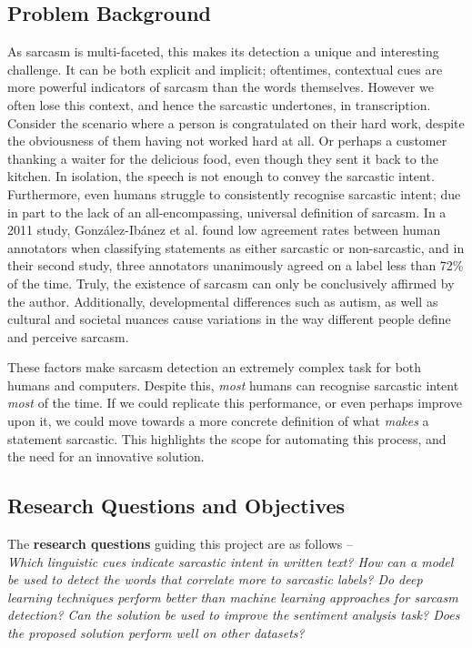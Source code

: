\documentclass[12pt,a4paper]{article}
\begin{document}
\subsection{Problem Background}
\noindent As sarcasm is multi-faceted, this makes its detection a unique and interesting challenge. It can be both explicit and implicit; oftentimes, contextual cues are more powerful indicators of sarcasm than the words themselves. However we often lose this context, and hence the sarcastic undertones, in transcription. Consider the scenario where a person is congratulated on their hard work, despite the obviousness of them having not worked hard at all. Or perhaps a customer thanking a waiter for the delicious food, even though they sent it back to the kitchen. In isolation, the speech is not enough to convey the sarcastic intent. Furthermore, even humans struggle to consistently recognise sarcastic intent; due in part to the lack of an all-encompassing, universal definition of sarcasm. In a 2011 study, Gonz{\'a}lez-Ib{\'a}nez et al. \cite{gonzalez2011identifying} found low agreement rates between human annotators when classifying statements as either sarcastic or non-sarcastic, and in their second study, three annotators unanimously agreed on a label less than 72\% of the time. Truly, the existence of sarcasm can only be conclusively affirmed by the author. Additionally, developmental differences such as autism, as well as cultural and societal nuances cause variations in the way different people define and perceive sarcasm.

These factors make sarcasm detection an extremely complex task for both humans and computers. Despite this, \textit{most} humans can recognise sarcastic intent \textit{most} of the time. If we could replicate this performance, or even perhaps improve upon it, we could move towards a more concrete definition of what \textit{makes} a statement sarcastic. This highlights the scope for automating this process, and the need for an innovative solution.

\subsection{Research Questions and Objectives}
\noindent The \textbf{research questions} guiding this project are as follows --
\\ \indent \textit{Which linguistic cues indicate sarcastic intent in written text? How can a model be used to detect the words that correlate more to sarcastic labels? Do deep learning techniques perform better than machine learning approaches for sarcasm detection? Can the solution be used to improve the sentiment analysis task? Does the proposed solution perform well on other datasets?}\\
\end{document}
